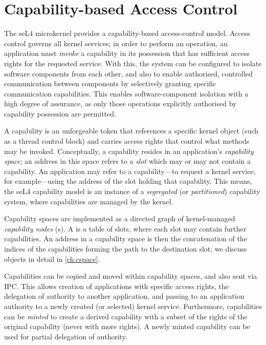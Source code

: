 \section{Capability-based Access Control}
\label{sec:cap-access-control}

The seL4 microkernel provides a capability-based access-control model.
Access control governs all kernel services; in order to perform an
operation, an application must \emph{invoke} a capability in its
possession that has sufficient access rights for the requested service.
With this, the system can be configured to isolate software components from
each other, and also to enable authorised, controlled communication
between components by selectively granting specific communication
capabilities.  This enables software-component isolation with a high
degree of assurance, as only those operations explicitly authorised by
capability possession are permitted.

A capability is an unforgeable token that references a specific kernel
object (such as a thread control block) and carries access rights that
control what methods may be invoked.
Conceptually, a capability resides in an application's \emph{capability
space}; an address in this space refers to a \emph{slot} which may or
may not contain a capability.  An application may refer to
a capability---to request a kernel service, for example---using the
address of the slot holding that capability.  This means, the seL4 
capability model is an instance of a \emph{segregated} (or \emph{partitioned})
capability system, where capabilities are managed by the kernel.

Capability spaces are implemented as a directed graph of kernel-managed
\emph{capability nodes} (s).  A  is a table of
slots, where each slot may contain further  capabilities. An
address in a capability space is then the concatenation of the indices
of the  capabilities forming the path to the destination
slot; we discuss  objects in detail in \autoref{ch:cspace}.

Capabilities can be copied and moved within capability spaces, and
also sent via IPC. This allows creation of applications with specific
access rights, the delegation of authority to another application, and
passing to an application authority to a newly created (or selected)
kernel service. Furthermore, capabilities can be \emph{minted} to
create a derived capability with a subset of the rights of the
original capability (never with more rights). A newly minted
capability can be used for partial delegation of authority.

